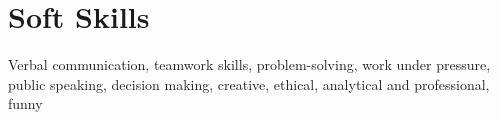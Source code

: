 \documentclass[letterpaper,11pt]{article}
\begin{document}
\section{Soft Skills}
\begin{itemize}[leftmargin=0.15in, label={}]
\small{
\item{Verbal communication, teamwork skills, problem-solving, work under pressure, public speaking, decision making, creative, ethical, analytical and professional, funny}
}
\end{itemize}

\end{document}
